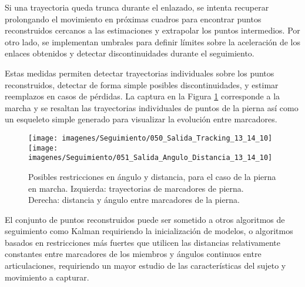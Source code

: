 Si una trayectoria queda trunca durante el enlazado, se intenta recuperar prolongando el movimiento en próximas cuadros para encontrar puntos reconstruidos cercanos a las estimaciones y extrapolar los puntos intermedios. Por otro lado, se implementan umbrales para definir límites sobre la aceleración de los enlaces obtenidos y detectar discontinuidades durante el seguimiento.

Estas medidas permiten detectar trayectorias individuales sobre los puntos reconstruidos, detectar de forma simple posibles discontinuidades, y estimar reemplazos en casos de pérdidas. La captura en la Figura \ref{restricciones_tracking} corresponde a la marcha y se resaltan las trayectorias individuales de puntos de la pierna así como un esqueleto simple generado para visualizar la evolución entre marcadores.\\
\begin{figure}[ht!]
 \begin{center}
  {\texttt{[image: imagenes/Seguimiento/050\_Salida\_Tracking\_13\_14\_10]} %
   }	
 {\texttt{[image: imagenes/Seguimiento/051\_Salida\_Angulo\_Distancia\_13\_14\_10]}\label{distancia_angulo_marcadores_piernas}}
  \end{center}
\caption{Posibles restricciones en ángulo y distancia, para el caso de la pierna en marcha. Izquierda: trayectorias de marcadores de pierna. Derecha: distancia y ángulo entre marcadores de la pierna.}
\label{restricciones_tracking}
\end{figure}
El conjunto de puntos reconstruidos puede ser sometido a otros algoritmos de seguimiento como Kalman \cite{kalman} requiriendo la inicialización de modelos, o algoritmos basados en restricciones más fuertes que utilicen las distancias relativamente constantes entre marcadores de los miembros y ángulos continuos entre articulaciones, requiriendo un mayor estudio de las características del sujeto y movimiento a capturar. %

